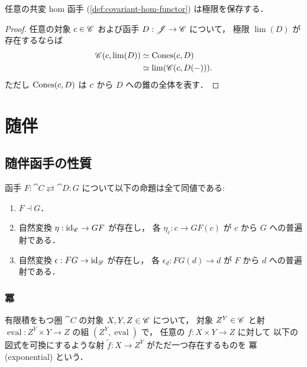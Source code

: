 \documentclass[titlepage]{ltjsreport}
\begin{document}
\begin{theorem}\label{thm:hom-functor-preserves-limits}
  任意の共変 hom 函手 (\cref{def:covariant-hom-functor}) は極限を保存する．
\end{theorem}
\begin{proof}
  \def\C{\cat{C}}%
  \def\c{\obj{c}}%
  \def\f{F}%
  \def\J{\cat{J}}%
  \def\diagram{D}%
  任意の対象 $\c\in\objs{\C}$ および函手 $\mrp{\diagram}{\J}{\C}$ について，
  極限 $\lim(\diagram)$ が存在するならば
  \begin{align}
    \mrps{\C}{\c}{\lim(\diagram)}
     & \simeq\operatorname{Cones}(\c,\diagram) \\
     & \simeq\lim(\mrps{\C}{\c}{\diagram(-)}).
  \end{align}
  ただし $\operatorname{Cones}(\c,\diagram)$ は
  $\c$ から $\diagram$ への錐の全体を表す．
\end{proof}

\chapter{随伴}

\section{随伴函手の性質}

\begin{theorem}[随伴函手の並列定義]\label{thm:adjoint-functor-definitions}
  函手 $F:\cat{C}\rightleftarrows\cat{D}:G$ について以下の命題は全て同値である:
  \begin{enumerate}
    \item $F\dashv G$．
    \item 自然変換 $\eta:\mathrm{id}_{\mathscr{C}}\to GF$ が存在し，
          各 $\eta_c:c\to GF(c)$ が $c$ から $G$ への普遍射である．
    \item 自然変換 $\epsilon:FG\to\mathrm{id}_{\mathscr{D}}$ が存在し，
          各 $\epsilon_d:FG(d)\to d$ が $F$ から $d$ への普遍射である．
  \end{enumerate}
\end{theorem}

\subsection{冪}

\begin{definition}[冪]
  \def\C{\cat{C}}%
  \def\a{X}%
  \def\b{Y}%
  \def\c{Z}%
  \def\e{\operatorname{eval}}%
  有限積をもつ圏 $\C$ の対象 $\a,\b,\c\in\objs{\C}$ について，
  対象 $\c^\b\in\objs{\C}$ と射 $\e:\c^\b\times\b\to\c$ の組 $(\c^\b,\e)$ で，
  任意の $f:\a\times\b\to\c$ に対して
  以下の図式を可換にするような射 $\tilde{f}:\a\to\c^\b$ がただ一つ存在するものを
  冪 (exponential) という．
  \begin{center}
    
  \end{center}
\end{definition}
\end{document}
